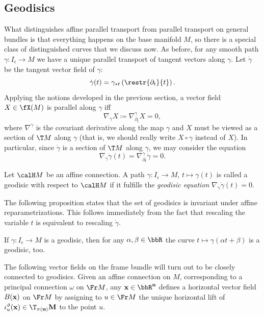 \subsection{Geodisics}


What distinguishes affine parallel transport from parallel transport on general bundles is that everything happens on the base manifold $M$, so there is a special class of distinguished curves that we discuss now. As before, for any smooth path $\gamma:I_\epsilon\to M$ we have a unique parallel transport of tangent vectors along $\gamma$. Let $\dot\gamma$ be the tangent vector field of $\gamma$:
\[\dot\gamma(t)=\gamma_{\ast t}\left(\restr{\partial_t}{t}\right).\]
Applying the notions developed in the previous section, a vector field $X\in \fX(M)$ is parallel along $\gamma$ iff 
\[\nabla_{\dot\gamma}X\coloneqq \nabla^\gamma_{\partial_t}X=0,\label{eq 2.1.34 RS2}\]
where $\nabla^\gamma$ is the covariant derivative along the map $\gamma$ and $X$ must be viewed as a section of $\T M$ along $\gamma$ (that is, we should really write $X\circ\gamma$ instead of $X$). In particular, since $\dot\gamma$ is a section of $\T M$ along $\gamma$, we may consider the equation 
\[\nabla_{\dot\gamma}\dot\gamma(t)=\nabla^\gamma_{\partial_t}\dot\gamma=0.\label{eq 2.1.35 RS2}\] 

\begin{defn}[Geodisic]
    Let $\calH M$ be an affine connection. A path $\gamma:I_\epsilon\to M$, $t\mapsto \gamma(t)$ is called a geodisic with respect to $\calH M$ if it fulfills the \emph{geodisic equation} $\nabla_{\dot\gamma}\dot\gamma(t)=0$.
\end{defn}

The following proposition states that the set of geodisics is invariant under affine reparametrizations. This follows immediately from the fact that rescaling the variable $t$ is equivalent to rescaling $\dot\gamma$.
\begin{prop}[{{\cite[Prop.~2.1.21]{RS2}}}]\label{prop 2.1.21 RS2}
    If $\gamma:I_\epsilon\to M$ is a geodisic, then for any $\alpha,\beta\in\bbR$ the curve $t\mapsto \gamma(\alpha t+\beta)$ is a geodisic, too.
\end{prop}


The following vector fields on the frame bundle will turn out to be closely connected to geodisics. Given an affine connection on $M$, corresponding to a principal connection $\omega$ on $\Fr M$, any $\bf{x}\in\bbR^n$ defines a horizontal vector field $B(\bf{x})$ on $\Fr M$ by assigning to $u\in\Fr M$ the unique horizontal lift of $\iota_u^\vartheta(\bf{x})\in \T_{\pi(u)}M$ to the point $u$.

